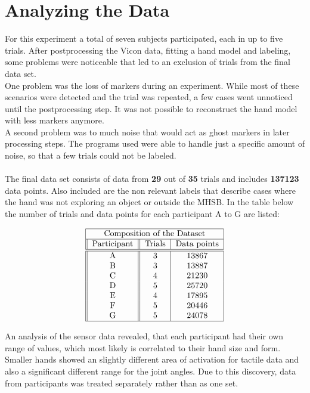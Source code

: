 \section{Analyzing the Data}
For this experiment a total of seven subjects participated, each in up to five trials. After postprocessing the Vicon data, fitting a hand model and labeling, some problems were noticeable that led to an exclusion of trials from the final data set.\\
One problem was the loss of markers during an experiment. While most of these scenarios were detected and the trial was repeated, a few cases went unnoticed until the postprocessing step. It was not possible to reconstruct the hand model with less markers anymore.\\
A second problem was to much noise that would act as ghost markers in later processing steps. The programs used were able to handle just a specific amount of noise, so that a few trials could not be labeled.\\
\\
The final data set consists of data from \textbf{29} out of \textbf{35} trials and includes \textbf{137123} data points. Also included are the non relevant labels that describe cases where the hand was not exploring an object or outside the MHSB. In the table below the number of trials and data points for each participant A to G are listed:   

\begin{align}
	\label{database}
	\begin{tabular}{||c||c|c|c}
		\hline
		\multicolumn{3}{|c|}{Composition of the Dataset} \\
		\hline
		Participant & Trials & Data points \\
		\hline\hline
		A & 3 & 13867 \\
		B & 3 & 13887 \\
		C & 4 & 21230 \\
		D & 5 & 25720 \\
		E & 4 & 17895 \\
		F & 5 & 20446 \\
		G & 5 & 24078 \\
		\hline
	\end{tabular}
\end{align} 

An analysis of the sensor data revealed, that each participant had their own range of values, which most likely is correlated to their hand size and form. Smaller hands showed an slightly different area of activation for tactile data and also a significant different range for the joint angles. Due to this discovery, data from participants was treated separately rather than as one set. 